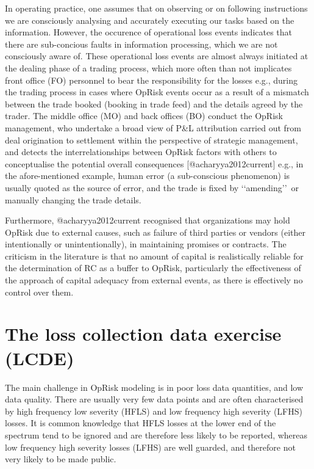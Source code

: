 \documentclass[]{article}
\begin{document}
In operating practice, one assumes that on observing or on following
instructions we are consciously analysing and accurately executing our
tasks based on the information. However, the occurence of operational
loss events indicates that there are sub-concious faults in information
processing, which we are not consciously aware of. These operational
loss events are almost always initiated at the dealing phase of a
trading process, which more often than not implicates front office (FO)
personnel to bear the responsibility for the losses e.g., during the
trading process in cases where OpRisk events occur as a result of a
mismatch between the trade booked (booking in trade feed) and the
details agreed by the trader. The middle office (MO) and back offices
(BO) conduct the OpRisk management, who undertake a broad view of P\&L
attribution carried out from deal origination to settlement within the
perspective of strategic management, and detects the interrelationships
between OpRisk factors with others to conceptualise the potential
overall consequences {[}@acharyya2012current{]} e.g., in the
afore-mentioned example, human error (a sub-conscious phenomenon) is
usually quoted as the source of error, and the trade is fixed by
\lq\lq amending\rq\rq~or manually changing the trade details. \medskip

Furthermore, @acharyya2012current recognised that organizations may hold
OpRisk due to external causes, such as failure of third parties or
vendors (either intentionally or unintentionally), in maintaining
promises or contracts. The criticism in the literature is that no amount
of capital is realistically reliable for the determination of RC as a
buffer to OpRisk, particularly the effectiveness of the approach of
capital adequacy from external events, as there is effectively no
control over them.\medskip

\section{The loss collection data exercise (LCDE)}
\label{sec:The loss collection data exercise (LCDE)}

The main challenge in OpRisk modeling is in poor loss data quantities,
and low data quality. There are usually very few data points and are
often characterised by high frequency low severity (HFLS) and low
frequency high severity (LFHS) losses. It is common knowledge that HFLS
losses at the lower end of the spectrum tend to be ignored and are
therefore less likely to be reported, whereas low frequency high
severity losses (LFHS) are well guarded, and therefore not very likely
to be made public.\medskip
\end{document}
